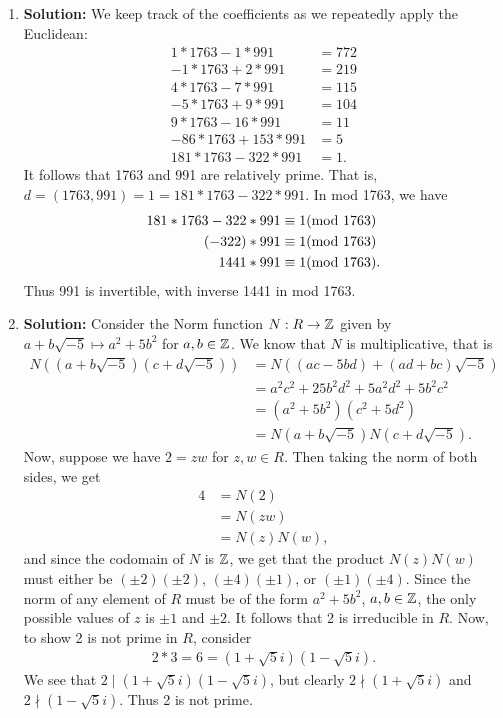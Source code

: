 \begin{enumerate}
    \item \textbf{Solution:}
    We keep track of the coefficients as we repeatedly apply the Euclidean:
    \begin{align*}
        1 * 1763 - 1 * 991 &= 772 \\
        -1 * 1763 + 2 * 991 &= 219 \\
        4 * 1763 - 7 * 991 &= 115 \\
        -5 * 1763 + 9 * 991 &= 104 \\
        9 * 1763 - 16 * 991 &= 11 \\
        -86 * 1763 + 153 * 991 &= 5 \\
        181 * 1763 - 322 * 991 &= 1.
    \end{align*}
    It follows that 1763 and 991 are relatively prime. That is, $d = (1763, 991) = 1 = 181 * 1763 - 322 * 991$. In mod  1763, we have
    \begin{align*}
        181 * 1763 - 322 * 991 &\equiv 1 \text{(mod 1763)} \\
        (-322) * 991 &\equiv 1 \text{(mod 1763)} \\
        1441 * 991 &\equiv 1 \text{(mod 1763)}.
    \end{align*}
    Thus 991 is invertible, with inverse 1441 in mod 1763.
    
    \item \textbf{Solution:}
    Consider the Norm function $N: R \to \mathbb{Z}$ given by $a + b\sqrt{-5} \mapsto a^2 + 5b^2$ for $a, b \in \mathbb{Z}$. We know that $N$ is multiplicative, that is 
    \begin{align*}
        N((a + b\sqrt{-5})(c + d\sqrt{-5})) &= N((ac - 5bd) + (ad + bc)\sqrt{-5}) \\
        &= a^2c^2 + 25b^2d^2 + 5a^2d^2 + 5b^2c^2 \\
        &= (a^2 + 5b^2)(c^2 + 5d^2) \\
        &= N(a + b\sqrt{-5})N(c + d\sqrt{-5}).
    \end{align*}
    Now, suppose we have $2 = zw$ for $z, w \in R$. Then taking the norm of both sides, we get
    \begin{align*}
        4 &= N(2) \\
            &= N(zw) \\
            &= N(z)N(w),
    \end{align*}
    and since the codomain of $N$ is $\mathbb{Z}$, we get that the product $N(z)N(w)$ must either be $(\pm 2)(\pm 2)$, $(\pm 4)(\pm 1)$, or $(\pm 1)(\pm 4)$. Since the norm of any element of $R$ must be of the form $a^2 + 5b^2$, $a, b \in \mathbb{Z}$, the only possible values of $z$ is $\pm 1$ and $\pm 2$. It follows that 2 is irreducible in $R$. Now, to show 2 is not prime in $R$, consider
    \begin{align}
        2 * 3 = 6 = (1 + \sqrt{5}i)(1 - \sqrt{5}i).
    \end{align}
    We see that $2 \mid (1 + \sqrt{5}i)(1 - \sqrt{5}i)$, but clearly $2 \nmid (1 + \sqrt{5}i)$ and $2 \nmid (1 - \sqrt{5}i)$. Thus 2 is not prime.
    

\end{enumerate}
